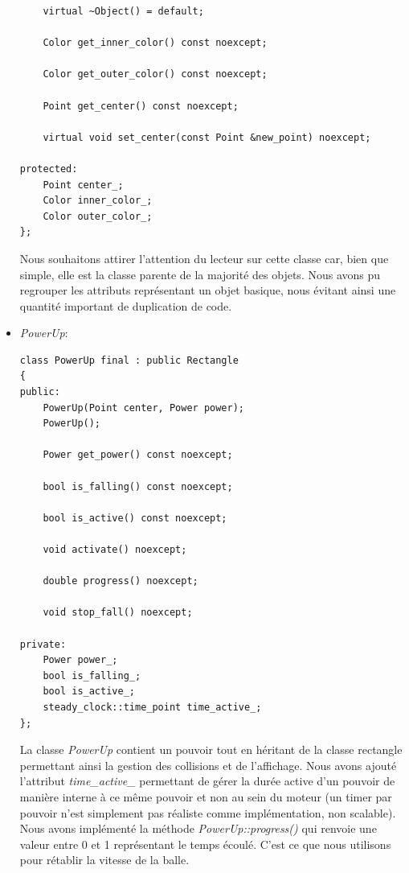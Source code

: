 \documentclass[utf8]{article}
\begin{document}
\begin{itemize}
\begin{verbatim}
    virtual ~Object() = default;

    Color get_inner_color() const noexcept;

    Color get_outer_color() const noexcept;

    Point get_center() const noexcept;

    virtual void set_center(const Point &new_point) noexcept;

protected:
    Point center_;
    Color inner_color_;
    Color outer_color_;
};
    \end{verbatim}
    Nous souhaitons attirer l'attention du lecteur sur cette classe car, bien que simple, elle est la classe parente de la majorité des objets. Nous avons pu regrouper les attributs représentant un objet basique, nous évitant ainsi une quantité important de duplication de code. \\

    \item \emph{PowerUp}:
    \begin{verbatim}
class PowerUp final : public Rectangle
{
public:
    PowerUp(Point center, Power power);
    PowerUp();

    Power get_power() const noexcept;

    bool is_falling() const noexcept;

    bool is_active() const noexcept;

    void activate() noexcept;

    double progress() noexcept;

    void stop_fall() noexcept;

private:
    Power power_;
    bool is_falling_;
    bool is_active_;
    steady_clock::time_point time_active_;
};
    \end{verbatim}
    La classe \emph{PowerUp} contient un pouvoir tout en héritant de la classe rectangle permettant ainsi la gestion des collisions et de l'affichage. Nous avons ajouté l'attribut \emph{time\_active\_} permettant de gérer la durée active d'un pouvoir de manière interne à ce même pouvoir et non au sein du moteur (un timer par pouvoir n'est simplement pas réaliste comme implémentation, non scalable). Nous avons implémenté la méthode \emph{PowerUp::progress()} qui renvoie une valeur entre 0 et 1 représentant le temps écoulé. C'est ce que nous utilisons pour rétablir la vitesse de la balle. \\

\end{itemize}
\end{document}
